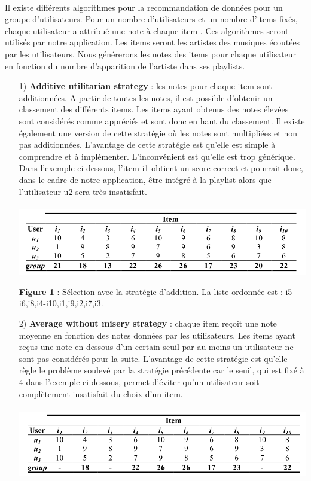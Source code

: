\documentclass[12pt, openany]{report}
\begin{document}
\paragraph{}Il existe différents algorithmes pour la recommandation de données pour un groupe d'utilisateurs. Pour un nombre d'utilisateurs et un nombre d'items fixés, chaque utilisateur a attribué une note à chaque item \cite {Group}. Ces algorithmes seront utilisés par notre application. Les items seront les artistes des musiques écoutées par les utilisateurs. Nous générerons les notes des items pour chaque utilisateur en fonction du nombre d'apparition de l'artiste dans ses playlists.
\\
\begin{itemize}
\item[1)] \textbf{Additive utilitarian strategy} : les notes pour chaque item sont additionnées. A partir de toutes les notes, il est possible d'obtenir un classement des différents items. Les items ayant obtenus des notes élevées sont considérés comme appréciés et sont donc en haut du classement. Il existe également une version de cette stratégie où les notes sont multipliées et non pas additionnées. L'avantage de cette stratégie est qu'elle est simple à comprendre et à implémenter. L'inconvénient est qu'elle est trop générique. Dans l'exemple ci-dessous, l'item i1 obtient un score correct et pourrait donc, dans le cadre de notre application, être intégré à la playlist alors que l'utilisateur u2 sera très insatisfait.
\\
\\
\includegraphics[scale=0.4]{images/_additive.png}

\textbf{Figure 1} : Sélection avec la stratégie d'addition. La liste ordonnée est : i5-i6,i8,i4-i10,i1,i9,i2,i7,i3.
\\
\item[2)] \textbf{Average without misery strategy} : chaque item reçoit une note moyenne en fonction des notes données par les utilisateurs. Les items ayant reçus une note en dessous d'un certain seuil par au moins un utilisateur ne sont pas considérés pour la suite. L'avantage de cette stratégie est qu'elle règle le problème soulevé par la stratégie précédente car le seuil, qui est fixé à 4 dans l'exemple ci-dessous, permet d'éviter qu'un utilisateur soit complètement insatisfait du choix d'un item.
\\
\\
\includegraphics[scale=0.4]{images/_average_without_misery.png}


\end{itemize}
\end{document}
